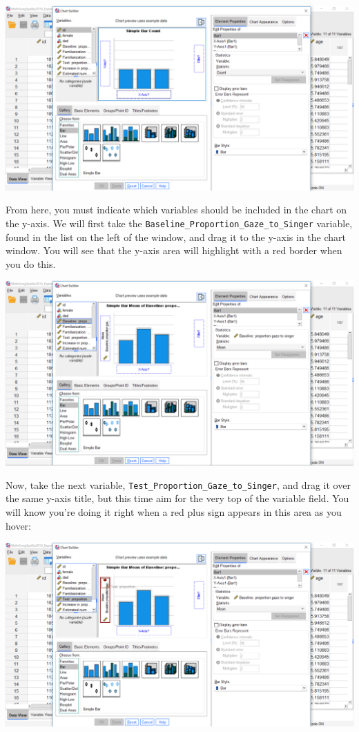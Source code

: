 \documentclass[]{book}
\begin{document}
\includegraphics{img/6.4.23.png}

From here, you must indicate which variables should be included in the
chart on the y-axis. We will first take the
\texttt{Baseline\_Proportion\_Gaze\_to\_Singer} variable, found in the
list on the left of the window, and drag it to the y-axis in the chart
window. You will see that the y-axis area will highlight with a red
border when you do this.

\includegraphics{img/6.4.24.png}

Now, take the next variable,
\texttt{Test\_Proportion\_Gaze\_to\_Singer}, and drag it over the same
y-axis title, but this time aim for the very top of the variable field.
You will know you're doing it right when a red plus sign appears in this
area as you hover:

\includegraphics{img/6.4.25.png}
\end{document}

